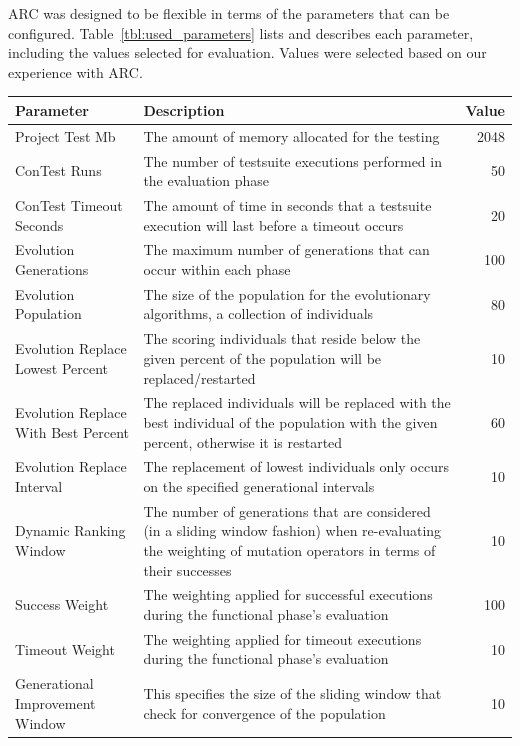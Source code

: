 \documentclass[10pt, conference, compsocconf]{IEEEtran}
\begin{document}
ARC was designed to be flexible in terms of the parameters that can be
configured. Table~\ref{tbl:used_parameters} lists and describes each parameter,
including the values selected for evaluation. Values were selected based on
our experience with ARC.

\begin{table}[!t]
\begin{center}
\begin{tabular}{|p{3cm}|p{10cm}|r|}
\hline
\textbf{Parameter} &
\textbf{Description} &
\textbf{Value}
\\\hline
Project Test Mb & The amount of memory allocated for the testing & 2048
\\\hline
ConTest Runs & The number of testsuite executions performed in the evaluation phase & 50
\\\hline
ConTest Timeout Seconds & The amount of time in seconds that a testsuite execution will last before a timeout occurs & 20
\\\hline
Evolution Generations & The maximum number of generations that can occur within each phase  & 100
\\\hline
Evolution Population & The size of the population for the evolutionary algorithms, a collection of individuals& 80
\\\hline
Evolution Replace Lowest Percent & The scoring individuals that reside below the given percent of the population will be replaced/restarted & 10
\\\hline
Evolution Replace With Best Percent & The replaced individuals will be replaced with the best individual of the population with the given percent, otherwise it is restarted & 60
\\\hline
Evolution Replace Interval & The replacement of lowest individuals only occurs on the specified generational intervals & 10
\\\hline
Dynamic Ranking Window & The number of generations that are considered (in a sliding window fashion) when re-evaluating the weighting of mutation operators in terms of their successes & 10
\\\hline
Success Weight & The weighting applied for successful executions during the functional phase's evaluation & 100
\\\hline
Timeout Weight & The weighting applied for timeout executions during the functional phase's evaluation & 10
\\\hline
Generational Improvement Window & This specifies the size of the sliding window that check for convergence of the population & 10

\end{tabular}
\end{center}
\end{table}
\end{document}
